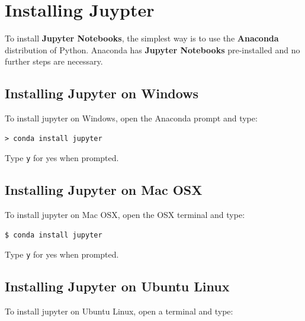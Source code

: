 \documentclass{book}
\begin{document}
    
        \section{Installing Juypter}\label{installing-juypter}
    




    
        To install \textbf{Jupyter Notebooks}, the simplest way is to use the
\textbf{Anaconda} distribution of Python. Anaconda has \textbf{Jupyter
Notebooks} pre-installed and no further steps are necessary.
    




    
        \subsection{Installing Jupyter on
Windows}\label{installing-jupyter-on-windows}

To install jupyter on Windows, open the Anaconda prompt and type:

\begin{lstlisting}
> conda install jupyter
\end{lstlisting}

Type \lstinline!y! for yes when prompted.
    




    
        \subsection{Installing Jupyter on Mac
OSX}\label{installing-jupyter-on-mac-osx}

To install jupyter on Mac OSX, open the OSX terminal and type:

\begin{lstlisting}
$ conda install jupyter
\end{lstlisting}

Type \lstinline!y! for yes when prompted.
    




    
        \subsection{Installing Jupyter on Ubuntu
Linux}\label{installing-jupyter-on-ubuntu-linux}

To install jupyter on Ubuntu Linux, open a terminal and type:
\end{document}
